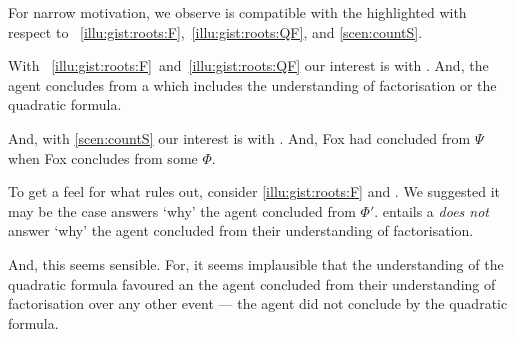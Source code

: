 \begin{note}
  For narrow motivation, we observe \issueInclusion{} is compatible with the  highlighted with respect to ~\ref{illu:gist:roots:F},~\ref{illu:gist:roots:QF}, and \ref{scen:countS}.

  With ~\ref{illu:gist:roots:F}~and~\ref{illu:gist:roots:QF} our interest is with .
  And, the agent concludes  from a \pool{} which includes the \agents{} understanding of factorisation or the quadratic formula.

  And, with \autoref{scen:countS} our interest is with .
  And, Fox had concluded  from \(\Psi\) when Fox concludes  from some \pool{} \(\Phi\).
\end{note}


\begin{note}
  To get a feel for what \issueInclusion{} rules out, consider \autoref{illu:gist:roots:F} and .
  We suggested it may be the case  answers `why' the agent concluded  from \(\Phi'\).
  \issueInclusion{} entails a  \emph{does not} answer `why' the agent concluded  from their understanding of factorisation.

  And, this seems sensible.
  For, it seems implausible that the \agents{} understanding of the quadratic formula favoured an  the agent concluded  from their understanding of factorisation over any other event --- the agent did not conclude by the quadratic formula.
\end{note}


